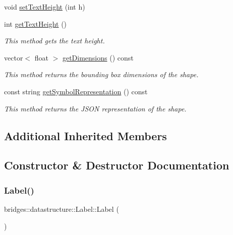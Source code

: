 \begin{DoxyCompactItemize}
void \hyperlink{classbridges_1_1datastructure_1_1_label_acd095180b94bad422f7c26182680a958}{set\+Text\+Height} (int h)
\item 
int \hyperlink{classbridges_1_1datastructure_1_1_label_aeaf64e048094d69e11e77563c598a045}{get\+Text\+Height} ()
\begin{DoxyCompactList}\small\item\em This method gets the text height. \end{DoxyCompactList}\item 
vector$<$ float $>$ \hyperlink{classbridges_1_1datastructure_1_1_label_a39f904db9e21e038aa4c7cb274f657a5}{get\+Dimensions} () const
\begin{DoxyCompactList}\small\item\em This method returns the bounding box dimensions of the shape. \end{DoxyCompactList}\item 
const string \hyperlink{classbridges_1_1datastructure_1_1_label_aa3b7c9e5630ecc8a2534e6db2a220e90}{get\+Symbol\+Representation} () const
\begin{DoxyCompactList}\small\item\em This method returns the J\+S\+ON representation of the shape. \end{DoxyCompactList}\end{DoxyCompactItemize}
\subsection*{Additional Inherited Members}


\subsection{Constructor \& Destructor Documentation}
\mbox{\label{classbridges_1_1datastructure_1_1_label_abd73b3f555e6de007b7cb82cdf7c57cd}} 
\subsubsection{\texorpdfstring{Label()}{Label()}\hspace{0.1cm}{\footnotesize\ttfamily [1/2]}}
{\footnotesize\ttfamily bridges\+::datastructure\+::\+Label\+::\+Label (\begin{DoxyParamCaption}{ }\end{DoxyParamCaption})\hspace{0.3cm}{\ttfamily [inline]}}

